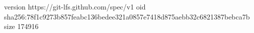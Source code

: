 version https://git-lfs.github.com/spec/v1
oid sha256:78f1c9273b857feabc136bedee321a0857e7418d875aebb32c6821387bebca7b
size 174916
